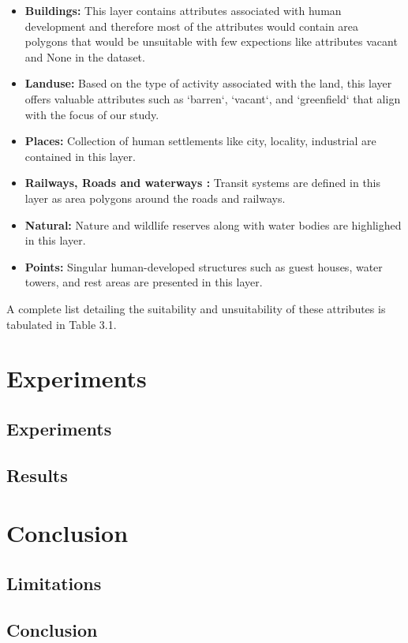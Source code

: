 \documentclass[a4paper,12pt]{Classes/RoboticsLaTeX}
\begin{document}
	\begin{itemize}
		\item \textbf{Buildings: } This layer contains attributes associated with human development and therefore most of the attributes would contain area polygons that would be unsuitable with few expections 
		like attributes vacant and None in the dataset.
		\item \textbf{Landuse: } Based on the type of activity associated with the land, this layer offers valuable attributes such as `barren`, `vacant`, and `greenfield` that align with the focus of our study.
		\item \textbf{Places: } Collection of human settlements like city, locality, industrial are contained in this layer.
		\item \textbf{Railways, Roads and waterways : } Transit systems are defined in this layer as area polygons around the roads and railways.
		\item \textbf{Natural: } Nature and wildlife reserves along with water bodies are highlighed in this layer.
		\item \textbf{Points: } Singular human-developed structures such as guest houses, water towers, and rest areas are presented in this layer.
	\end{itemize}

	A complete list detailing the suitability and unsuitability of these attributes is tabulated in Table 3.1.

	
	\chapter{Experiments}

	\section{Experiments}
	\section{Results}

	\chapter{Conclusion}
	\label{chap:conclusion}
	\section{Limitations}
	\section{Conclusion}
\end{document}

